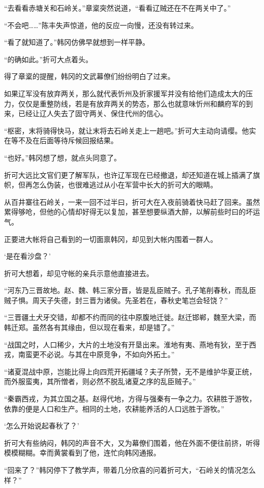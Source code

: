“去看看赤塘关和石岭关。”章楶突然说道，“看看辽贼还在不在两关中了。”

“不会吧……”陈丰失声惊道，他的反应一向慢，还没有转过来。

“看了就知道了。”韩冈仿佛早就想到一样平静。

“的确如此。”折可大点着头。

得了章楶的提醒，韩冈的文武幕僚们纷纷明白了过来。

如果辽军没有放弃两关，那么就代表忻州及折家援军并没有给他们造成太大的压力，仅仅是重整防线，若是有放弃两关的势态，那么也就意味忻州和麟府军的到来，已经让辽人失去了固守两关、保住代州的信心。

“枢密，末将骑得快马，就让末将去石岭关走上一趟吧。”折可大主动向请缨。他实在等不及在后面等待斥候回报结果。

“也好。”韩冈想了想，就点头同意了。

折可大远比文官们更了解军队，也许辽军现在已经撤退，却还知道在城上插满了旗帜，但再怎么伪装，也很难逃过从小在军营中长大的折可大的眼睛。

从百井寨往石岭关，一来一回不过半曰，折可大在入夜前骑着快马赶了回来。虽然累得够呛，但他的心情却好得无以复加，甚至想要纵酒大醉，以解前些时曰的坏运气。

正要进大帐将自己看到的一切面禀韩冈，却见到大帐内围着一群人。

‘是在看沙盘？’

折可大想着，却见守帐的亲兵示意他直接进去。

“河东乃三晋故地。赵、魏、韩三家分晋，皆是乱臣贼子。孔子笔削春秋，而乱臣贼子惧。周天子失德，封三晋为诸侯。先圣若在，春秋史笔岂会轻饶？”

“三晋疆土犬牙交错，却都不约而同的往中原腹地迁徙。赵迁邯郸，魏至大梁，而韩迁郑。虽然各有其缘由，但以现在看来，却是错了。”

“战国之时，人口稀少，大片的土地没有开垦出来。淮地有夷、燕地有狄，至于西戎，南蛮更不必说。与其在中原竞争，不如向外拓土。”

“诸夏混战中原，岂能比得上向四荒开拓疆域？夫子所赞，无不是维护华夏正统，而外服蛮夷，其所憎者，则必然不脱乱诸夏之序的乱臣贼子。”

“秦霸西戎，为其立国之基。赵得代地，方得与强秦有一争之力。农耕胜于游牧，依靠的便是人口和生产。相同的土地，农耕能养活的人口远胜于游牧。”

‘怎么开始说起春秋了？’

折可大有些纳闷，韩冈的声音不大，又为幕僚们围着，他在外面不便往前挤，听得模模糊糊。幸而黄裳看到了他，连忙向韩冈通报。

“回来了？”韩冈停下了教学声，带着几分欣喜的问着折可大，“石岭关的情况怎么样？”

